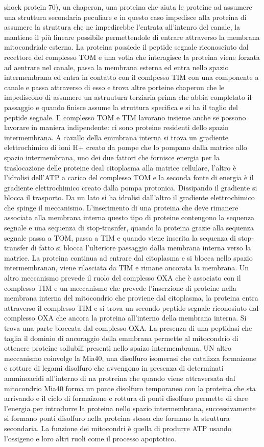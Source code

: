 shock protein 70), un chaperon, una proteina che aiuta le proteine ad assumere una struttura secondaria peculiare e in questo caso impedisce alla proteina di assumere la struttura che
ne impedirebbe l'entrata all'intenro del canale, la mantiene il pi\`u lineare possibile permettendole di entrare attraverso la membrana mitocondriale esterna. La proteina possiede il
peptide segnale riconosciuto dal recettore del complesso TOM e una votla che interagisce la proteina viene forzata ad aentrare nel canale, passa la membrana esterna ed entra nello spazio
intermembrana ed entra in contatto con il comlpesso TIM con una componente a canale e passa attraverso di esso e trova altre porteine chaperon che le impediscono di assumere un astruutura
terziaria prima che abbia completato il passaggio e quando finisce assume la struttura specifica e si ha il taglio del peptide segnale. Il complesso TOM e TIM lavorano insieme anche se
possono lavorare in maniera indipendente: ci sono proteine residenti dello spazio intermembrana. A cavallo della emmbrana interna si trova un gradiente elettrochimico di ioni H+ creato 
da pompe che lo pompano dalla matrice allo spazio intermembrana, uno dei due fattori che fornisce energia per la traslocazione delle proteine deal citoplasma alla matrice cellulare, 
l'altro \`e l'idrolisi dell'ATP a carico del complesso TOM e la seconda fonte di energia \`e il gradiente elettrochimico creato dalla pompa protonica. Dissipando il gradiente si blocca il
trasporto. Da un lato si ha idrolisi dall'altro il gradiente elettrochimico che spinge il meccanismo. L'inserimento di una proteina che deve rimanere associata alla membrana interna 
questo tipo di proteine contengono la sequenza segnale e una sequenza di stop-trasnfer, quando la proteina grazie alla sequenza segnale passa a TOM, passa a TIM e quando viene inserita la
sequenza di stop-transfer di fatto si blocca l'ulteriore passaggio dalla membrana interna verso la matrice. La proteina continua ad entrare dal citoplasma e si blocca nello spazio 
intermembranan, viene rilasciata da TIM e rimane ancorata la membrana. Un altro meccanismo prevede il ruolo del complesso OXA che \`e associato con il complesso TIM e un meccanismo 
che prevede l'inserzione di proteine nella membrana interna del mitocondrio che proviene dal citoplasma, la proteina entra attraverso il complesso TIM e si trova un secondo peptide
segnale riconosiuto dal complesso OXA che ancora la proteina all'interno della membrana interna. Si trova una parte bloccata dal complesso OXA. La presenza di una peptidasi che taglia
il dominio di ancoraggio della emmbrana permette al mitocondrio di ottenere proteine sollubili presenti nello spaizo intermembrana. UN altro meccanismo coinvolge la Mia40, una disolfuro
isomerasi che catalizza formaizone e rotture di legami disolfuro che avvengono in presenza di determinati amminoacidi all'interno di na protreina che quando viene attraversata dal 
mitocondrio Mia40 forma un ponte disolfuro temporaneo con la proteina che sta arrivando e il ciclo di formaizone e rottura di ponti disolfuro permette di dare l'energia per introdurre
la proteina nello spazio intermembrana, successivamente si formano ponti disolfuro nella proteina stessa che formano la struttura secondaria. La funzione dei mitocondri \`e quella di 
produrre ATP usando l'ossigeno e loro altri ruoli come il processo apoptotico. 

